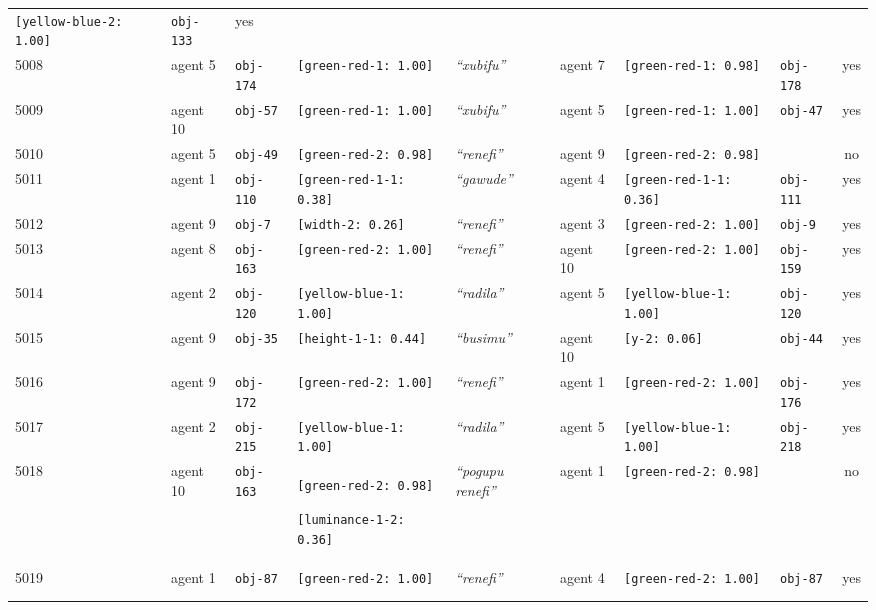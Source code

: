 {\begin{tabular}{lllp{3.7cm}llp{3.7cm}lc}
\texttt{[yellow-blue-2: 1.00]} & \texttt{obj-133} & yes \\
5008 & agent 5 & \texttt{obj-174} & \texttt{[green-red-1: 1.00]} & \textit{``xubifu''} & agent 7 & \texttt{[green-red-1: 0.98]} & \texttt{obj-178} & yes \\
5009 & agent 10 & \texttt{obj-57} & \texttt{[green-red-1: 1.00]} & \textit{``xubifu''} & agent 5 & \texttt{[green-red-1: 1.00]} & \texttt{obj-47} & yes \\
5010 & agent 5 & \texttt{obj-49} & \texttt{[green-red-2: 0.98]} & \textit{``renefi''} & agent 9 & \texttt{[green-red-2: 0.98]} & \texttt{} & no \\
5011 & agent 1 & \texttt{obj-110} & \texttt{[green-red-1-1: 0.38]} & \textit{``gawude''} & agent 4 & \texttt{[green-red-1-1: 0.36]} & \texttt{obj-111} & yes \\
5012 & agent 9 & \texttt{obj-7} & \texttt{[width-2: 0.26]} & \textit{``renefi''} & agent 3 & \texttt{[green-red-2: 1.00]} & \texttt{obj-9} & yes \\
5013 & agent 8 & \texttt{obj-163} & \texttt{[green-red-2: 1.00]} & \textit{``renefi''} & agent 10 & \texttt{[green-red-2: 1.00]} & \texttt{obj-159} & yes \\
5014 & agent 2 & \texttt{obj-120} & \texttt{[yellow-blue-1: 1.00]} & \textit{``radila''} & agent 5 & \texttt{[yellow-blue-1: 1.00]} & \texttt{obj-120} & yes \\
5015 & agent 9 & \texttt{obj-35} & \texttt{[height-1-1: 0.44]} & \textit{``busimu''} & agent 10 & \texttt{[y-2: 0.06]} & \texttt{obj-44} & yes \\
5016 & agent 9 & \texttt{obj-172} & \texttt{[green-red-2: 1.00]} & \textit{``renefi''} & agent 1 & \texttt{[green-red-2: 1.00]} & \texttt{obj-176} & yes \\
5017 & agent 2 & \texttt{obj-215} & \texttt{[yellow-blue-1: 1.00]} & \textit{``radila''} & agent 5 & \texttt{[yellow-blue-1: 1.00]} & \texttt{obj-218} & yes \\
5018 & agent 10 & \texttt{obj-163} & \texttt{[green-red-2: 0.98]}

\texttt{[luminance-1-2: 0.36]} & \textit{``pogupu renefi''} & agent 1 & \texttt{[green-red-2: 0.98]} & \texttt{} & no \\
5019 & agent 1 & \texttt{obj-87} & \texttt{[green-red-2: 1.00]} & \textit{``renefi''} & agent 4 & \texttt{[green-red-2: 1.00]} & \texttt{obj-87} & yes \\
\\[1.0em]
 \\\end{tabular}}




